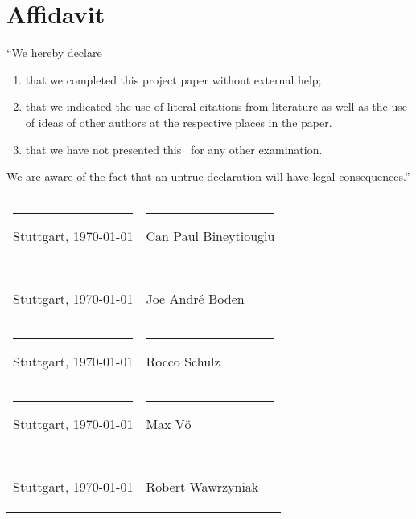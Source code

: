 \newpage
\pagestyle{empty}

\section*{Affidavit}

\vspace{0.5cm}

``We hereby declare\\

\begin{enumerate}
	\item that we completed this project paper without external help;
	\item that we indicated the use of literal citations from literature as well as the use of ideas of other authors at the respective places in the paper.
	\item that we have not presented this \papertype \ for any other examination.
\end{enumerate}

We are aware of the fact that an untrue declaration will have legal consequences.''
\\
\vspace{2.6cm}

\renewcommand{\arraystretch}{2} %

\begin{tabular*}{\textwidth} {p{} p{}}

\rule{0.3\textwidth}{1pt} \newline Stuttgart, \today & \rule{0.4\textwidth}{1pt}\newline Can Paul Bineytiouglu\\

\rule{0.3\textwidth}{1pt} \newline Stuttgart, \today & \rule{0.4\textwidth}{1pt}\newline Joe Andr\'{e} Boden\\

\rule{0.3\textwidth}{1pt} \newline Stuttgart, \today & \rule{0.4\textwidth}{1pt}\newline Rocco Schulz\\

\rule{0.3\textwidth}{1pt} \newline Stuttgart, \today & \rule{0.4\textwidth}{1pt}\newline Max V\"{o}\\

\rule{0.3\textwidth}{1pt} \newline Stuttgart, \today & \rule{0.4\textwidth}{1pt}\newline Robert Wawrzyniak\\
\end{tabular*}
